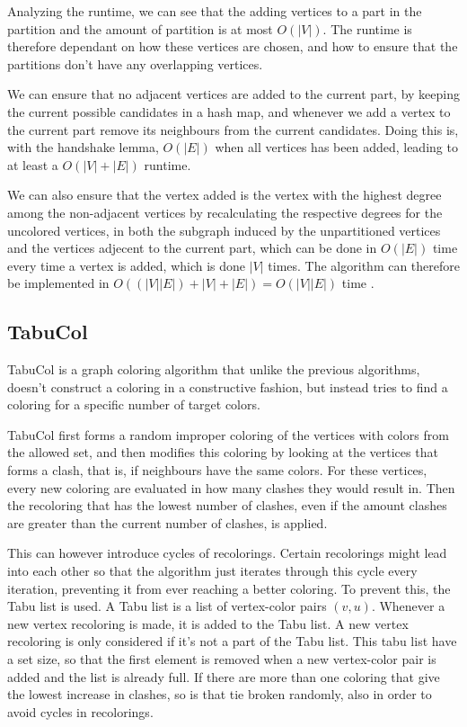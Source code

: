 \documentclass[a4paper]{article}
\begin{document}
Analyzing the runtime, we can see that the adding vertices to a
part in the partition and the amount of partition is at most $O(|V|)$. The
runtime is therefore dependant on how these vertices are chosen, and how to
ensure that the partitions don't have any overlapping vertices. 

We can ensure
that no adjacent vertices are added to the current part, by keeping the current
possible candidates in a hash map, and whenever we add a vertex to the current
part remove its neighbours from the current candidates. Doing this is, with the
handshake lemma, $O(|E|)$ when all vertices has been added, leading to at least
a $O(|V|+|E|)$ runtime.  

We can also ensure that the vertex added is the vertex with the highest degree among
the non-adjacent vertices by recalculating the respective degrees for the
uncolored vertices, in both the subgraph induced by the unpartitioned vertices and the vertices 
adjecent to the current part, which can be done in $O(|E|)$ time every time a vertex is
added, which is done $|V|$ times. The algorithm can therefore be implemented in
$O((|V||E|)+|V|+|E|) = O(|V||E|)$ time \cite{Constructive}.

\subsection{TabuCol}

TabuCol is a graph coloring algorithm that unlike the previous algorithms, doesn't
construct a coloring in a constructive fashion, but instead tries to find a
coloring for a specific number of target colors.

TabuCol first forms a random improper coloring of the vertices with colors from
the allowed set, and then modifies this coloring by looking at the vertices that
forms a clash, that is, if neighbours have the same colors. For these vertices,
every new coloring are evaluated in how many clashes they would result in. 
Then the recoloring that has the lowest number of clashes, even if the amount
clashes are greater than the current number of clashes, is applied.

This can however introduce cycles of recolorings. Certain recolorings might
lead into each other so that the algorithm just iterates through this cycle
every iteration, preventing it from ever reaching a better coloring. To prevent
this, the Tabu list is used. A Tabu list is a list of vertex-color pairs
$(v,u)$. Whenever a new vertex recoloring is made, it is added to the Tabu
list. A new vertex recoloring is only considered if it's not a part of the Tabu
list. This tabu list have a set size, so that the first element is removed when
a new vertex-color pair is added and the list is already full. If there are more than one coloring that give
the lowest increase in clashes, so is that tie broken randomly, also in order
to avoid cycles in recolorings.
\end{document}
